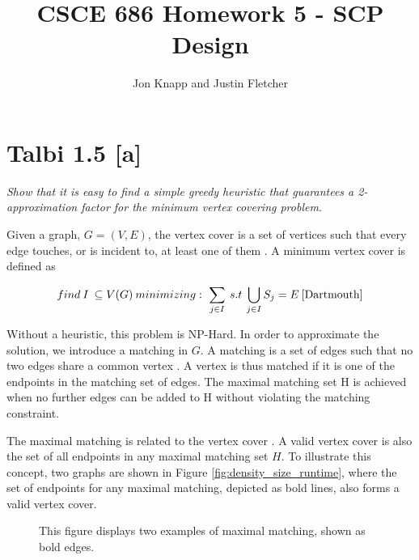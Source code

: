 \documentclass[12pt]{article}
\begin{document}
\title{CSCE 686 Homework 5 - SCP Design}
\author{Jon Knapp and Justin Fletcher}
\maketitle

\section{Talbi 1.5 [a]}
\textit{Show that it is easy to find a simple greedy heuristic that guarantees a 2-approximation factor for the minimum vertex covering problem.}
\linebreak

Given a graph, $G=(V, E)$, the vertex cover is a set of vertices such that every edge touches, or is incident to, at least one of them \cite{Lecture21}. A minimum vertex cover is defined as

\begin{align*}
find\:I\:\subseteq V(G)\:minimizing:\ \sum_{j \in I}\:s.t\:\bigcup_{j \in I}S_j=E \:\cite{Dartmouth}
\end{align*}

Without a heuristic, this problem is NP-Hard. In order to approximate the solution, we introduce a matching in $G$. A matching is a set of edges such that no two edges share a common vertex \cite{Suhendry}. A vertex is thus matched if it is one of the endpoints in the matching set of edges. The maximal matching set H is achieved when no further edges can be added to H without violating the matching constraint.

The maximal matching is related to the vertex cover \cite{Suhendry}. A valid vertex cover is also the set of all endpoints in any maximal matching set $H$. To illustrate this concept, two graphs are shown in Figure  \ref{fig:density_size_runtime}, where the set of endpoints for any maximal matching, depicted as bold lines, also forms a valid vertex cover.


\begin{figure} \label{fig:maximalmatchings}
	
	
	\begin{minipage}[b]{0.5\linewidth}
		
		\centering
	\end{minipage}
	\hfill
	
	\caption{This figure displays two examples of maximal matching, shown as bold edges.}
	
	
\end{figure}
\end{document}
